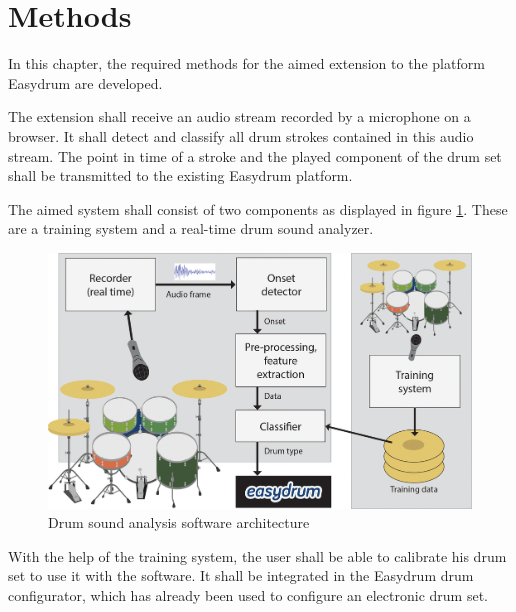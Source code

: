 \section{Methods} \label{section:methods}

In this chapter, the required methods for the aimed extension to the platform Easydrum are developed. 

The extension shall receive an audio stream recorded by a microphone on a browser. It shall detect and classify all drum strokes contained in this audio stream. The point in time of a stroke and the played component of the drum set shall be transmitted to the existing Easydrum platform.

The aimed system shall consist of two components as displayed in figure \ref{fig:architecture}. These are a training system and a real-time drum sound analyzer. 

\begin{figure}[ht]
	\centering
	\includegraphics[width=\textwidth]{images/architecture.png}
	\caption{Drum sound analysis software architecture}
	\label{fig:architecture}
\end{figure}

With the help of the training system, the user shall be able to calibrate his drum set to use it with the software. It shall be integrated in the Easydrum drum configurator, which has already been used to configure an electronic drum set.  


